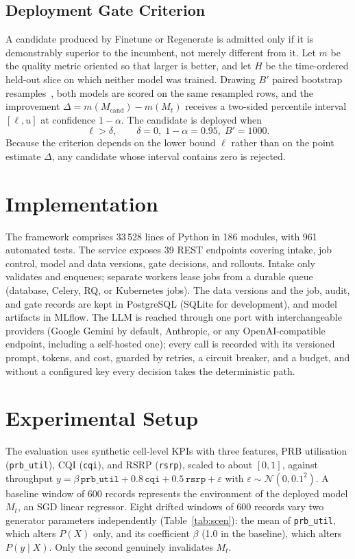 \documentclass[conference]{IEEEtran}
\begin{document}
\subsection{Deployment Gate Criterion}
A candidate produced by Finetune or Regenerate is admitted only if it is demonstrably superior to
the incumbent, not merely different from it. Let $m$ be the quality metric oriented so that larger
is better, and let $H$ be the time-ordered held-out slice on which neither model was trained.
Drawing $B'$ paired bootstrap resamples~\cite{zoubir1998bootstrap}, both models are scored on the
same resampled rows, and the improvement $\Delta = m(M_{\text{cand}}) - m(M_t)$ receives a
two-sided percentile interval $[\ell, u]$ at confidence $1-\alpha$. The candidate is deployed
when
\begin{equation}
\ell > \delta, \qquad \delta = 0,\; 1-\alpha = 0.95,\; B' = 1000.
\label{eq:gate}
\end{equation}
Because the criterion depends on the lower bound $\ell$ rather than on the point estimate
$\Delta$, any candidate whose interval contains zero is rejected.

\section{Implementation}
The framework comprises 33\,528 lines of Python in 186 modules, with 961 automated tests. The
service exposes 39 REST endpoints covering intake, job control, model and data versions, gate
decisions, and rollouts. Intake only validates and enqueues; separate workers lease jobs from a
durable queue (database, Celery, RQ, or Kubernetes jobs). The data versions and the job, audit,
and gate records are kept in PostgreSQL (SQLite for development), and model artifacts in MLflow.
The LLM is reached through one port with interchangeable providers (Google Gemini by default,
Anthropic, or any OpenAI-compatible endpoint, including a self-hosted one); every call is
recorded with its versioned prompt, tokens, and cost, guarded by retries, a circuit breaker, and
a budget, and without a configured key every decision takes the deterministic path.

\section{Experimental Setup}
The evaluation uses synthetic cell-level KPIs with three features, PRB utilisation
(\texttt{prb\_util}), CQI (\texttt{cqi}), and RSRP (\texttt{rsrp}), scaled to about $[0,1]$,
against throughput $y = \beta\,\texttt{prb\_util} + 0.8\,\texttt{cqi} + 0.5\,\texttt{rsrp} +
\varepsilon$ with $\varepsilon \sim \mathcal{N}(0, 0.1^2)$. A baseline window of 600 records
represents the environment of the deployed model $M_t$, an SGD linear regressor. Eight drifted
windows of 600 records vary two generator parameters independently (Table~\ref{tab:scen}): the
mean of \texttt{prb\_util}, which alters $P(X)$ only, and its coefficient $\beta$ (1.0 in the
baseline), which alters $P(y\mid X)$. Only the second genuinely invalidates $M_t$.
\end{document}
